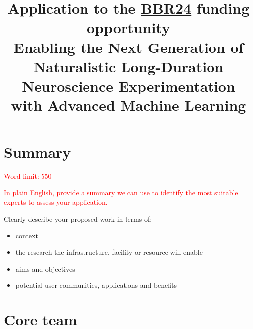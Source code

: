 \documentclass[12in]{article}
\title{Application to the
\href{https://www.ukri.org/opportunity/bioinformatics-and-biological-resources-fund-24bbr/}{BBR24}
funding opportunity\\\vspace{.5in}Enabling the Next Generation of Naturalistic Long-Duration Neuroscience
Experimentation with Advanced Machine Learning}
\begin{document}
\tableofcontents

\pagebreak

\maketitle

\section{Summary}

\textcolor{red}{Word limit: 550}

\textcolor{red}{In plain English, provide a summary we can use to identify the
most suitable experts to assess your application.}

{\color{red}

Clearly describe your proposed work in terms of:

\begin{itemize}
\item context
\item the research the infrastructure, facility or resource will enable
\item aims and objectives
\item potential user communities, applications and benefits
\end{itemize}
}



\pagebreak

\section{Core team}
\end{document}
